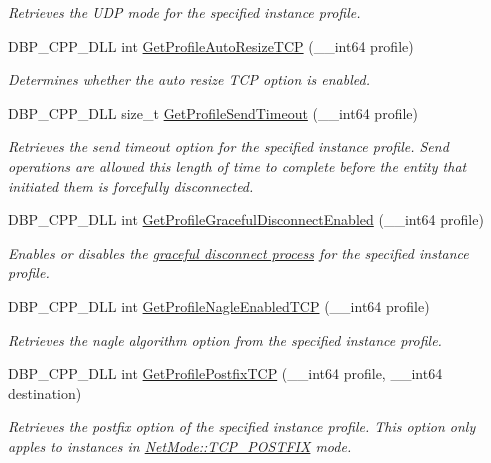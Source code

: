 \begin{DoxyCompactItemize}
\begin{DoxyCompactList}\small\item\em Retrieves the UDP mode for the specified instance profile. \item\end{DoxyCompactList}\item 
DBP\_\-CPP\_\-DLL int \hyperlink{namespacemn_a7d5b31e606b2fad59d6c92e8f896af47}{GetProfileAutoResizeTCP} (\_\-\_\-int64 profile)
\begin{DoxyCompactList}\small\item\em Determines whether the auto resize TCP option is enabled. \item\end{DoxyCompactList}\item 
DBP\_\-CPP\_\-DLL size\_\-t \hyperlink{namespacemn_a8b32e26ca40b7d1e7318bc3d4d9a29bc}{GetProfileSendTimeout} (\_\-\_\-int64 profile)
\begin{DoxyCompactList}\small\item\em Retrieves the send timeout option for the specified instance profile. Send operations are allowed this length of time to complete before the entity that initiated them is forcefully disconnected. \item\end{DoxyCompactList}\item 
DBP\_\-CPP\_\-DLL int \hyperlink{namespacemn_af44ffb1aa298412b6f62ab90ea11cfd8}{GetProfileGracefulDisconnectEnabled} (\_\-\_\-int64 profile)
\begin{DoxyCompactList}\small\item\em Enables or disables the \hyperlink{graceful_disconnect_page}{graceful disconnect process} for the specified instance profile. \item\end{DoxyCompactList}\item 
DBP\_\-CPP\_\-DLL int \hyperlink{namespacemn_a367cd31a98fa72fd8a15d45ccc4376ce}{GetProfileNagleEnabledTCP} (\_\-\_\-int64 profile)
\begin{DoxyCompactList}\small\item\em Retrieves the nagle algorithm option from the specified instance profile. \item\end{DoxyCompactList}\item 
DBP\_\-CPP\_\-DLL int \hyperlink{namespacemn_a75ec773a0f4496d15438bdc9b87b7836}{GetProfilePostfixTCP} (\_\-\_\-int64 profile, \_\-\_\-int64 destination)
\begin{DoxyCompactList}\small\item\em Retrieves the postfix option of the specified instance profile. This option only apples to instances in \hyperlink{class_net_mode_a43cfa55ee6a4db66a8d7d6c27f766964abe08876125a416186e74c901f6d29ce4}{NetMode::TCP\_\-POSTFIX} mode. \item\end{DoxyCompactList}\item 

\end{DoxyCompactItemize}
